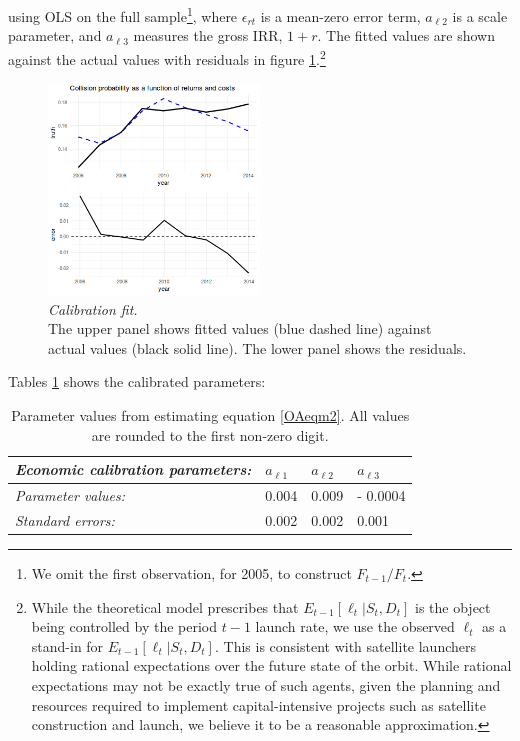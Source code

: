 \documentclass[12pt]{article}
\begin{document}
using OLS on the full sample\footnote{We omit the first observation, for 2005, to construct $F_{t-1}/F_{t}$.}, where $\epsilon_{rt}$ is a mean-zero error term, $a_{\ell 2}$ is a scale parameter, and $a_{\ell 3}$ measures the gross IRR, $1+r$. The fitted values are shown against the actual values with residuals in figure \ref{econCalibration}.\footnote{While the theoretical model prescribes that $E_{t-1}[\ell_t|S_t,D_t]$ is the object being controlled by the period $t-1$ launch rate, we use the observed $\ell_t$ as a stand-in for $E_{t-1}[\ell_t|S_t,D_t]$. This is consistent with satellite launchers holding rational expectations over the future state of the orbit. While rational expectations may not be exactly true of such agents, given the planning and resources required to implement capital-intensive projects such as satellite construction and launch, we believe it to be a reasonable approximation.}

\begin{figure}[H]
	\centering
	\includegraphics[width=0.5\textwidth]{../../images/risk_return_plot.png}
	\captionsetup{format=hang}
	\caption{\textit{Calibration fit.} \\
		The upper panel shows fitted values (blue dashed line) against actual values (black solid line). The lower panel shows the residuals.
	}
	\label{econCalibration}
\end{figure}

Tables \ref{econParms} shows the calibrated parameters:

\begin{table}[H]
	\centering
	\begin{tabular}{|l|l|l|l|}
		\hline
		\textit{Economic calibration parameters:}      & \textbf{$a_{\ell 1}$} & \textbf{$a_{\ell 2}$} & \textbf{$a_{\ell 3}$} \\ \hline
		\textit{Parameter values:} & 0.004               & 0.009               & - 0.0004 \\ \hline
		\textit{Standard errors:} & 0.002 & 0.002 & 0.001 \\ \hline
	\end{tabular}
	\caption{Parameter values from estimating equation \ref{OAeqm2}. All values are rounded to the first non-zero digit.}
	\label{econParms}
\end{table}
\end{document}
